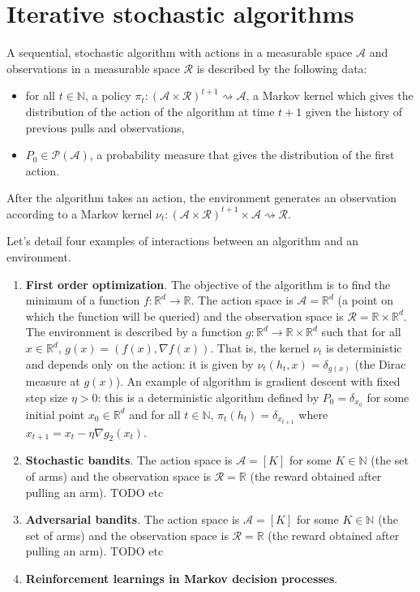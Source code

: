 \chapter{Iterative stochastic algorithms}


\begin{definition}[Algorithm]\label{def:algorithm'}
  \leanok
A sequential, stochastic algorithm with actions in a measurable space $\mathcal{A}$ and observations in a measurable space $\mathcal{R}$ is described by the following data:
\begin{itemize}
  \item for all $t \in \mathbb{N}$, a policy $\pi_t : (\mathcal{A} \times \mathcal{R})^{t+1} \rightsquigarrow \mathcal{A}$, a Markov kernel which gives the distribution of the action of the algorithm at time $t+1$ given the history of previous pulls and observations,
  \item $P_0 \in \mathcal{P}(\mathcal{A})$, a probability measure that gives the distribution of the first action.
\end{itemize}
\end{definition}

After the algorithm takes an action, the environment generates an observation according to a Markov kernel $\nu_t : (\mathcal{A} \times \mathcal{R})^{t+1} \times \mathcal{A} \rightsquigarrow \mathcal{R}$.

Let's detail four examples of interactions between an algorithm and an environment.
\begin{enumerate}
  \item \textbf{First order optimization}. The objective of the algorithm is to find the minimum of a function $f : \mathbb{R}^d \to \mathbb{R}$.
  The action space is $\mathcal{A} = \mathbb{R}^d$ (a point on which the function will be queried) and the observation space is $\mathcal{R} = \mathbb{R} \times \mathbb{R}^d$.
  The environment is described by a function $g : \mathbb{R}^d \to \mathbb{R} \times \mathbb{R}^d$ such that for all $x \in \mathbb{R}^d$, $g(x) = (f(x), \nabla f(x))$. That is, the kernel $\nu_t$ is deterministic and depends only on the action: it is given by $\nu_t(h_t, x) = \delta_{g(x)}$ (the Dirac measure at $g(x)$).
  An example of algorithm is gradient descent with fixed step size $\eta > 0$: this is a deterministic algorithm defined by $P_0 = \delta_{x_0}$ for some initial point $x_0 \in \mathbb{R}^d$ and for all $t \in \mathbb{N}$, $\pi_t(h_t) = \delta_{x_{t+1}}$ where $x_{t+1} = x_t - \eta \nabla g_2(x_t)$.
  \item \textbf{Stochastic bandits}. The action space is $\mathcal{A} = [K]$ for some $K \in \mathbb{N}$ (the set of arms) and the observation space is $\mathcal{R} = \mathbb{R}$ (the reward obtained after pulling an arm).
  TODO etc
  \item \textbf{Adversarial bandits}. The action space is $\mathcal{A} = [K]$ for some $K \in \mathbb{N}$ (the set of arms) and the observation space is $\mathcal{R} = \mathbb{R}$ (the reward obtained after pulling an arm).
  TODO etc
  \item \textbf{Reinforcement learnings in Markov decision processes}.
\end{enumerate}


